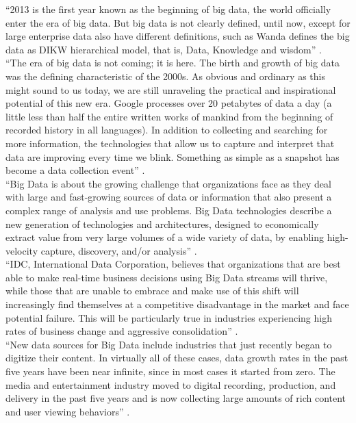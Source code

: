 \documentclass[sigconf]{acmart}
\begin{document}
``2013 is the first year known as the beginning of big data, the world officially enter the era of big data. But big data is not clearly defined, until now, except for large enterprise data also have different definitions, such as Wanda defines the big data as DIKW hierarchical model, that is, Data, Knowledge and wisdom'' \cite{Zhang2017era}. \\
``The era of big data is not coming; it is here. The birth and growth of big data was the defining characteristic of the 2000s. As obvious and ordinary as this might sound to us today, we are still unraveling the practical and inspirational potential of this new era. Google processes over 20 petabytes of data a day (a little less than half the entire written works of mankind from the beginning of recorded history in all languages). In addition to collecting and searching for more information, the technologies that allow us to capture and interpret that data are improving every time we blink. Something as simple as a snapshot has become a data collection event'' \cite{Schlieski2012data}. \\
``Big Data is about the growing challenge that organizations face as they deal with large and fast-growing sources of data or information that also present a complex range of analysis and use problems. Big Data technologies describe a new generation of technologies and architectures, designed to economically extract value from very large volumes of a wide variety of data, by enabling high-velocity capture, discovery, and/or analysis'' \cite{Villars2011care}. \\
``IDC, International Data Corporation, believes that organizations that are best able to make real-time business decisions using Big Data streams will thrive, while those that are unable to embrace and make use of this shift will increasingly find themselves at a competitive disadvantage in the market and face potential failure. This will be particularly true in industries experiencing high rates of business change and aggressive consolidation'' \cite{Villars2011care}. \\
``New data sources for Big Data include industries that just recently began to digitize their content. In virtually all of these cases, data growth rates in the past five years have been near infinite, since in most cases it started from zero. The media and entertainment industry moved to digital recording, production, and delivery in the past five years and is now collecting large amounts of rich content and user viewing behaviors'' \cite{Villars2011care}.
\end{document}
